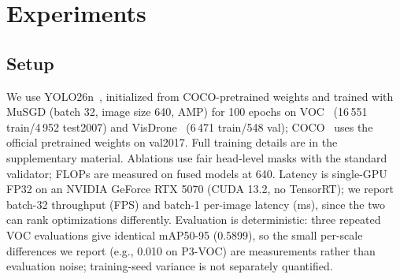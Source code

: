 \documentclass[times,twocolumn,final,authoryear]{elsarticle}
\begin{document}
\section{Experiments}\label{sec:exp}
\subsection{Setup}
We use YOLO26n~\cite{jocher2026ultralyticsyolo26unifiedrealtime}, initialized from COCO-pretrained weights and trained with MuSGD (batch 32, image size 640, AMP) for 100 epochs on VOC~\cite{everingham2010voc} (16\,551 train/4\,952 test2007) and VisDrone~\cite{zhu2022visdrone} (6\,471 train/548 val); COCO~\cite{lin2014coco} uses the official pretrained weights on val2017. Full training details are in the supplementary material. Ablations use fair head-level masks with the standard validator; FLOPs are measured on fused models at 640. Latency is single-GPU FP32 on an NVIDIA GeForce RTX 5070 (CUDA 13.2, no TensorRT); we report batch-32 throughput (FPS) and batch-1 per-image latency (ms), since the two can rank optimizations differently. Evaluation is deterministic: three repeated VOC evaluations give identical mAP50-95 (0.5899), so the small per-scale differences we report (e.g., 0.010 on P3-VOC) are measurements rather than evaluation noise; training-seed variance is not separately quantified.
\end{document}
